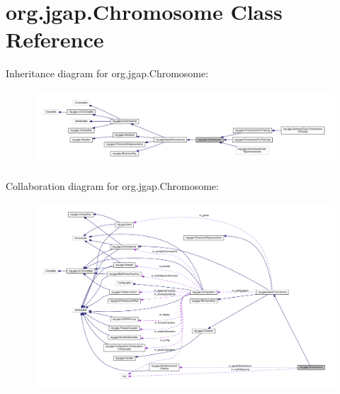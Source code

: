 \hypertarget{classorg_1_1jgap_1_1_chromosome}{\section{org.\-jgap.\-Chromosome Class Reference}
\label{classorg_1_1jgap_1_1_chromosome}
}


Inheritance diagram for org.\-jgap.\-Chromosome\-:
\nopagebreak
\begin{figure}[H]
\begin{center}
\leavevmode
\includegraphics[width=350pt]{classorg_1_1jgap_1_1_chromosome__inherit__graph}
\end{center}
\end{figure}


Collaboration diagram for org.\-jgap.\-Chromosome\-:
\nopagebreak
\begin{figure}[H]
\begin{center}
\leavevmode
\includegraphics[width=350pt]{classorg_1_1jgap_1_1_chromosome__coll__graph}
\end{center}
\end{figure}
